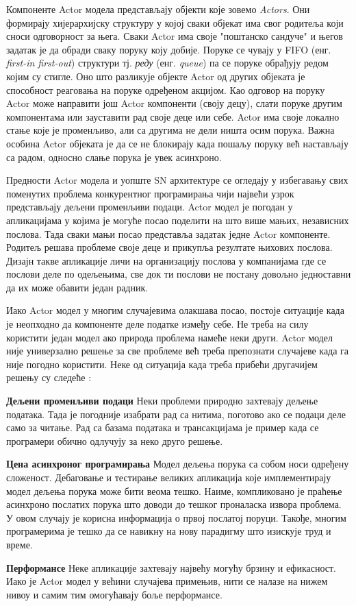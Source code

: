 \documentclass[12pt,oneside]{memoir}
\begin{document}
Компоненте Actor модела представљају објекти које зовемо \textit{Actors}. Они формирају хијерархијску структуру у којој сваки објекат има свог родитеља који сноси одговорност за њега. Сваки Actor има своје "поштанско сандуче" и његов задатак је да обради сваку поруку коју добије. Поруке се чувају у FIFO (енг. \textit{first-in first-out}) структури тј. \textit{реду} (енг. \textit{queue}) па се поруке обрађују редом којим су стигле. Оно што разликује објекте Actor од других објеката је способност реаговања на поруке одређеном акцијом. Као одговор на поруку Actor може направити још Actor компоненти (своју децу), слати поруке другим компонентама или зауставити рад своје деце или себе. Actor има своје локално стање које је променљиво, али са другима не дели ништа осим порука. Важна особина Actor објеката је да се не блокирају када пошаљу поруку већ настављају са радом, односно слање порука је увек асинхроно. 

Предности Actor модела и уопште SN архитектуре се огледају у избегавању свих поменутих проблема конкурентног програмирања чији највећи узрок представљају дељени променљиви подаци. Actor модел је погодан у апликацијама у којима је могуће посао поделити на што више мањих, независних послова. Тада сваки мањи посао представља задатак једне Actor компоненте. Родитељ решава проблеме своје деце и прикупља резултате њихових послова. Дизајн такве апликације личи на организацију послова у компанијама где се послови деле по одељењима, све док ти послови не постану довољно једноставни да их може обавити један радник. 

Иако Actor модел у многим случајевима олакшава посао, постоје ситуације када је неопходно да компоненте деле податке између себе. Не треба на силу користити један модел ако природа проблема намеће неки други. Actor модел није универзално решење за све проблеме већ треба препознати случајеве када га није погодно користити. Неке од ситуација када треба прибећи другачијем решењу су следеће \cite{progInScala3}:

\begin{description}
\item \textbf{Дељени променљиви подаци} Неки проблеми природно захтевају дељење података. Тада је погодније изабрати рад са нитима, поготово ако се подаци деле само за читање. Рад са базама података и трансакцијама је пример када се програмери обично одлучују за неко друго решење.
\item \textbf{Цена асинхроног програмирања} Модел дељења порука са собом носи одређену сложеност. Дебаговање и тестирање великих апликација које имплементирају модел дељења порука може бити веома тешко. Наиме, компликовано је праћење асинхроно послатих порука што доводи до тешког проналаска извора проблема. У овом случају је корисна информација о првој послатој поруци. Такође, многим програмерима је тешко да се навикну на нову парадигму што изискује труд и време.
\item \textbf{Перформансе} Неке апликације захтевају највећу могућу брзину и ефикасност. Иако је Actor модел у већини случајева примењив, нити се налазе на нижем нивоу и самим тим омогућавају боље перформансе. 
\end{description}
\end{document}
